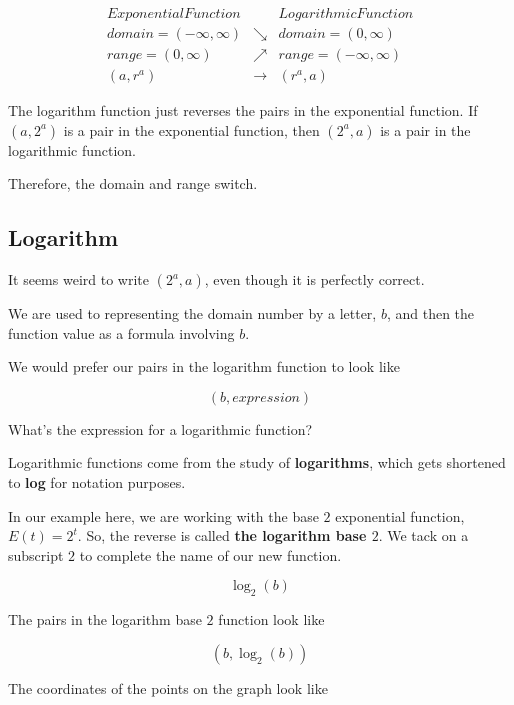 \documentclass{ximera}
\begin{document}
\[
\begin{array}{lcl}
Exponential Function  &     &  Logarithmic Function  \\
domain = (-\infty, \infty)  &  \searrow  &  domain = (0, \infty)  \\
range = (0, \infty)  &  \nearrow  &  range = (-\infty, \infty)  \\
(a, r^a)    &  \longrightarrow  &   (r^a, a)
\end{array}
\]


The logarithm function just reverses the pairs in the exponential function.  If $(a, 2^a)$ is a pair in the exponential function, then $(2^a, a)$ is a pair in the logarithmic function.


Therefore, the domain and range switch. 






\subsection*{Logarithm}

It seems weird to write $(2^a, a)$, even though it is perfectly correct.  

We are used to representing the domain number by a letter, $b$, and then the function value as a formula involving $b$.

We would prefer our pairs in the logarithm function to look like 

\[ (b, expression)  \]


What's the expression for a logarithmic function? 





Logarithmic functions come from the study of \textbf{logarithms}, which gets shortened to \textbf{log} for notation purposes.  



In our example here, we are working with the base $2$ exponential function, $E(t) = 2^t$. So, the reverse is called \textbf{the logarithm base $2$}.  We tack on a subscript $2$ to complete the name of our new function.



\[   \log_2(b)     \]


The pairs in the logarithm base $2$ function look like 


\[
(b, \log_2(b))
\]


The coordinates of the points on the graph look like
\end{document}

